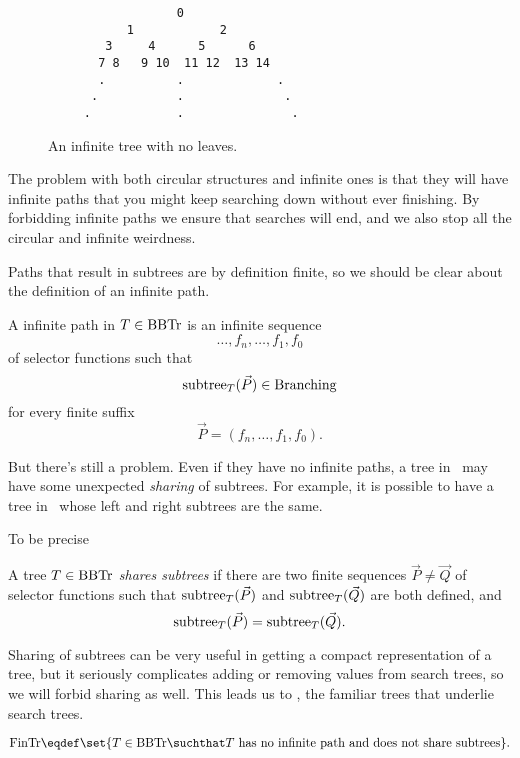 
\begin{figure}


\begin{verbatim}
                  0
           1            2
        3     4      5      6
       7 8   9 10  11 12  13 14
       .          .             . 
      .           .              .
     .            .               . 

\end{verbatim}

\caption{An infinite tree with no leaves.}

\label{inftree123}

\end{figure}

The problem with both circular structures and infinite ones is that
they will have infinite paths that you might keep searching down
without ever finishing.  By forbidding infinite paths we ensure that
searches will end, and we also stop all the circular and infinite
weirdness.

Paths that result in subtrees are by definition finite, so we should
be clear about the definition of an infinite path.

\begin{definition}
A infinite path in $T \in \text{BBTr}$ is an infinite sequence
\[
\dots,f_n,\dots,f_1,f_0
\]
of selector functions such that
\[
\text{subtree}_{T}(\vec{P}) \in \text{Branching}
\]
for every finite suffix
\[
\vec{P} = (f_n,\dots, f_1,f_0).
\]
\end{definition}

But there's still a problem.  Even if they
have no infinite paths, a tree in \brnch\ may have some unexpected
\emph{sharing} of subtrees.  For example, it is possible to have a
tree in \brnch\ whose left and right subtrees are the same.


To be precise
\begin{definition}
A tree $T \in \text{BBTr}$ \emph{shares subtrees} if there are two finite
sequences $\vec{P} \neq \vec{Q}$ of selector functions such that
$\text{subtree}_{T}(\vec{P})$ and $\text{subtree}_{T}(\vec{Q})$ are both defined, and
\[
\text{subtree}_{T}(\vec{P})=\text{subtree}_{T}(\vec{Q}).
\]
\end{definition}
Sharing of subtrees can be very useful in getting a compact
representation of a tree, but it seriously complicates adding or
removing values from search trees, so we will forbid sharing as well.
This leads us to \fintr, the familiar trees that underlie search
trees.
\begin{definition}
\[
\fintr \eqdef \set{T \in \brnch \suchthat T\ \text{has no infinite path and
  does not share subtrees}}.
\]
\end{definition}

